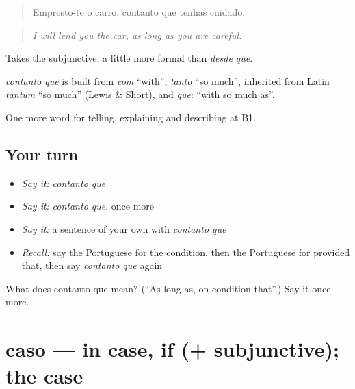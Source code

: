 \begin{quote}
Empresto-te o carro, contanto que tenhas cuidado.
\end{quote}

\begin{quote}
\emph{I will lend you the car, as long as you are careful.}
\end{quote}

Takes the subjunctive; a little more formal than \emph{desde que}.

\begin{cousinweb}
\emph{contanto que} is built from \emph{com} \textquotedblleft{}with\textquotedblright{}, \emph{tanto} \textquotedblleft{}so much\textquotedblright{}, inherited from Latin \emph{tantum} \textquotedblleft{}so much\textquotedblright{} (Lewis \& Short), and \emph{que}: \textquotedblleft{}with so much as\textquotedblright{}.
\end{cousinweb}

\begin{grammarlens}[title={What you've built}]
One more word for telling, explaining and describing at B1.
\end{grammarlens}

\subsection*{Your turn}
\begin{itemize}
\raggedright
  \item \emph{Say it:} \emph{contanto que}
  \item \emph{Say it:} \emph{contanto que}, once more
  \item \emph{Say it:} a sentence of your own with \emph{contanto que}
  \item \emph{Recall:} say the Portuguese for the condition, then the Portuguese for provided that, then say \emph{contanto que} again
\end{itemize}

\begin{tcolorbox}[breakable,colback=teal!4,colframe=teal!35!black,title={Before you move on}]
What does contanto que mean? (\textquotedblleft{}As long as, on condition that\textquotedblright{}.) Say it once more.
\end{tcolorbox}
\section[caso]{caso — in case, if (+ subjunctive); the case}

